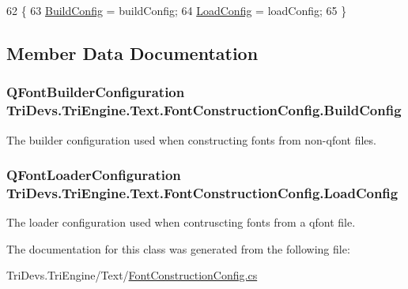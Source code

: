 \begin{DoxyCode}
62         \{
63             \hyperlink{class_tri_devs_1_1_tri_engine_1_1_text_1_1_font_construction_config_a0fe8631992fa99a13a799024cd44f7c4}{BuildConfig} = buildConfig;
64             \hyperlink{class_tri_devs_1_1_tri_engine_1_1_text_1_1_font_construction_config_a60c3e6fa0b71a0084eb9272fe3030b57}{LoadConfig} = loadConfig;
65         \}
\end{DoxyCode}


\subsection{Member Data Documentation}
\hypertarget{class_tri_devs_1_1_tri_engine_1_1_text_1_1_font_construction_config_a0fe8631992fa99a13a799024cd44f7c4}{
\subsubsection[{Build\-Config}]{\setlength{\rightskip}{0pt plus 5cm}Q\-Font\-Builder\-Configuration Tri\-Devs.\-Tri\-Engine.\-Text.\-Font\-Construction\-Config.\-Build\-Config}}\label{class_tri_devs_1_1_tri_engine_1_1_text_1_1_font_construction_config_a0fe8631992fa99a13a799024cd44f7c4}


The builder configuration used when constructing fonts from non-\/qfont files. 

\hypertarget{class_tri_devs_1_1_tri_engine_1_1_text_1_1_font_construction_config_a60c3e6fa0b71a0084eb9272fe3030b57}{
\subsubsection[{Load\-Config}]{\setlength{\rightskip}{0pt plus 5cm}Q\-Font\-Loader\-Configuration Tri\-Devs.\-Tri\-Engine.\-Text.\-Font\-Construction\-Config.\-Load\-Config}}\label{class_tri_devs_1_1_tri_engine_1_1_text_1_1_font_construction_config_a60c3e6fa0b71a0084eb9272fe3030b57}


The loader configuration used when contruscting fonts from a qfont file. 



The documentation for this class was generated from the following file\-:\begin{DoxyCompactItemize}
\item 
Tri\-Devs.\-Tri\-Engine/\-Text/\hyperlink{_font_construction_config_8cs}{Font\-Construction\-Config.\-cs}\end{DoxyCompactItemize}
